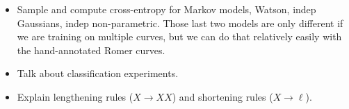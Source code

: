 
\begin{itemize}

\item Sample and compute cross-entropy for Markov models, Watson,
  indep Gaussians, indep non-parametric. Those last two models are
  only different if we are training on multiple curves, but we can do
  that relatively easily with the hand-annotated Romer curves.

\item Talk about classification experiments.

\item Explain lengthening rules ($X\to XX$) and shortening rules
  ($X\to \ell$).

\end{itemize}

